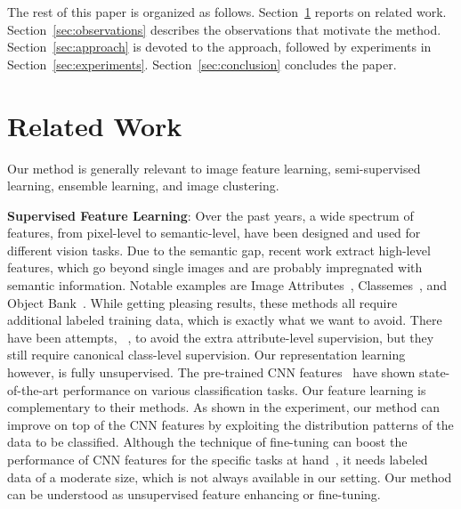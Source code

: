 \documentclass[preprint,12pt,3p]{elsarticle}
\begin{document}
The rest of this paper is organized as follows. Section~\ref{sec:related}
reports on related work. Section~\ref{sec:observations} describes the
observations that motivate the method. Section~\ref{sec:approach} is devoted to the approach, followed by experiments in
Section~\ref{sec:experiments}. Section~\ref{sec:conclusion} concludes the
paper.


\section{Related Work}
\label{sec:related}
Our method is generally relevant to image feature learning, semi-supervised
learning, ensemble learning, and image clustering.


\textbf{Supervised Feature Learning}: Over the past years, a wide spectrum of
features, from pixel-level to semantic-level, have been designed and
used for different vision tasks. Due to the semantic gap, recent work
extract high-level features, which go beyond single images and are
probably impregnated with semantic information. Notable examples are
Image Attributes~\citep{ObjectAttribute:cvpr09},
Classemes~\citep{eccv10:classemes}, and Object
Bank~\citep{li:objectbank}. While getting pleasing results, these
methods all require additional labeled training data, which is exactly
what we want to avoid.  There have been
attempts, \eg~\citep{augmented_attribute:eccv12, design_attribute:cvpr13}, to
avoid the extra attribute-level supervision, but they still require
canonical class-level supervision. Our representation learning
however, is fully unsupervised.  
The pre-trained CNN features~\citep{nips12:cnn, caffe14, rich:feature:cvpr14, deep:bmvc14}
have shown state-of-the-art performance on various classification tasks. Our feature 
learning is complementary to their methods. As shown in the experiment, our method can improve on top of 
the CNN features by exploiting the distribution patterns of the data to be classified.  
Although the technique of fine-tuning can 
boost the performance of CNN features for 
the specific tasks at hand~\citep{midlevel:transfer, cnn:transferable}, it needs labeled data of a moderate size, 
which is not always available in our setting.
Our method can be understood as unsupervised feature enhancing or fine-tuning.
\end{document}
